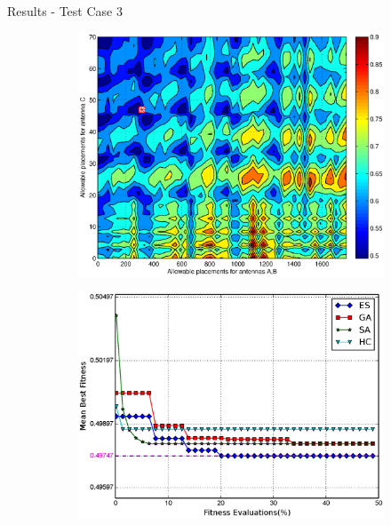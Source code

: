 \documentclass{beamer}
\begin{document}
\begin{frame}{Results - Test Case 3}
    \begin{figure}
        \centering
        \begin{subfigure}{.5\columnwidth}
            \includegraphics[width=\columnwidth,height=\columnwidth]{../paper/FIG/tc3_contour}%
        \end{subfigure}\hfill%
        \begin{subfigure}{.5\columnwidth}
            \includegraphics[width=\columnwidth, height=\columnwidth]{../paper/FIG/tc3_mf}%
        \end{subfigure}\hfill\\%
    \end{figure}
\end{frame}
\end{document}
